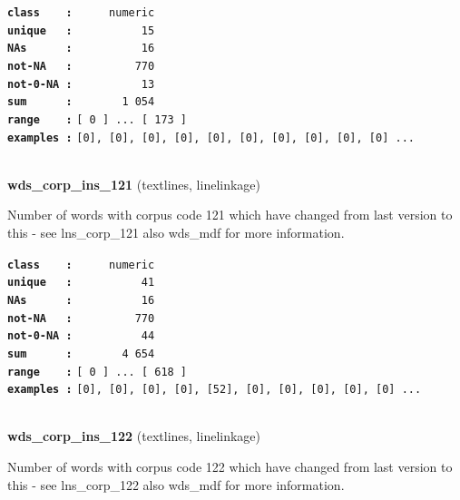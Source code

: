 \documentclass[]{article}
\begin{document}
\textbf{\texttt{class\ \ \ \ :}} \texttt{~~~~~numeric}\\
\textbf{\texttt{unique\ \ \ :}} \texttt{~~~~~~~~~~15}\\
\textbf{\texttt{NAs\ \ \ \ \ \ :}} \texttt{~~~~~~~~~~16}\\
\textbf{\texttt{not-NA\ \ \ :}} \texttt{~~~~~~~~~770}\\
\textbf{\texttt{not-0-NA\ :}} \texttt{~~~~~~~~~~13}\\
\textbf{\texttt{sum\ \ \ \ \ \ :}} \texttt{~~~~~~~1~054}\\
\textbf{\texttt{range\ \ \ \ :}}
\texttt{{[}\ 0\ {]}\ ...\ {[}\ 173\ {]}}\\
\textbf{\texttt{examples\ :}}
\texttt{{[}0{]},\ {[}0{]},\ {[}0{]},\ {[}0{]},\ {[}0{]},\ {[}0{]},\ {[}0{]},\ {[}0{]},\ {[}0{]},\ {[}0{]}\ ...}\\

~

\textbf{wds\_corp\_ins\_121} (textlines, linelinkage)

Number of words with corpus code 121 which have changed from last
version to this - see lns\_corp\_121 also wds\_mdf for more information.

\textbf{\texttt{class\ \ \ \ :}} \texttt{~~~~~numeric}\\
\textbf{\texttt{unique\ \ \ :}} \texttt{~~~~~~~~~~41}\\
\textbf{\texttt{NAs\ \ \ \ \ \ :}} \texttt{~~~~~~~~~~16}\\
\textbf{\texttt{not-NA\ \ \ :}} \texttt{~~~~~~~~~770}\\
\textbf{\texttt{not-0-NA\ :}} \texttt{~~~~~~~~~~44}\\
\textbf{\texttt{sum\ \ \ \ \ \ :}} \texttt{~~~~~~~4~654}\\
\textbf{\texttt{range\ \ \ \ :}}
\texttt{{[}\ 0\ {]}\ ...\ {[}\ 618\ {]}}\\
\textbf{\texttt{examples\ :}}
\texttt{{[}0{]},\ {[}0{]},\ {[}0{]},\ {[}0{]},\ {[}52{]},\ {[}0{]},\ {[}0{]},\ {[}0{]},\ {[}0{]},\ {[}0{]}\ ...}\\

~

\textbf{wds\_corp\_ins\_122} (textlines, linelinkage)

Number of words with corpus code 122 which have changed from last
version to this - see lns\_corp\_122 also wds\_mdf for more information.
\end{document}
